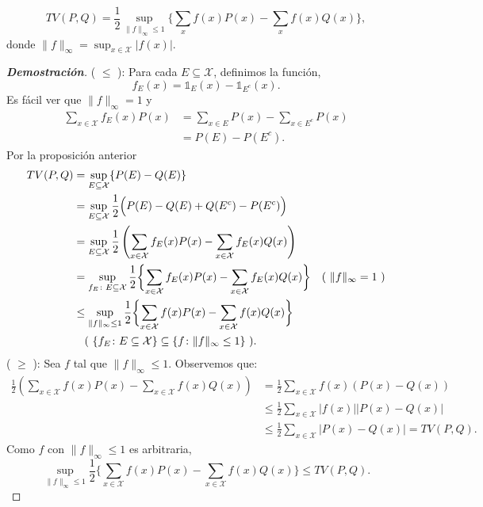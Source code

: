 \begin{theorem}
\begin{equation*}
    TV(P,Q)=\frac{1}{2}\sup_{\|f\|_{\infty}\leq1}\biggl\{\sum_{x}f(x)P(x)-\sum_{x}f(x)Q(x)\biggl\},
\end{equation*}
donde $\|f\|_{\infty}=\sup_{x\in\mathcal{X}}|f(x)|$.
\end{theorem}
\begin{proof}[\textbf{Demostraci\'on}]
( $\leq$ ): Para cada $E\subseteq\mathcal{X}$, definimos la funci\'on,
\begin{equation*}
    f_E(x)=\mathds{1}_E(x)-\mathds{1}_{E^c}(x).
\end{equation*}
Es f\'acil ver que $\|f\|_{\infty}=1$ y 
\begin{align*}
    \sum_{x\in\mathcal{X}}f_E(x)P(x)&=\sum_{x\in E}P(x)-\sum_{x\in E^c}P(x)\\
    &=P(E)-P(E^c).
\end{align*}
Por la proposici\'on anterior
\begin{align*}
    TV(P,Q)&=\sup_{E\subseteq\mathcal{X}}\{P(E)-Q(E)\}\\
    &=\sup_{E\subseteq\mathcal{X}}\frac{1}{2}\Bigl(P(E)-Q(E)+Q(E^c)-P(E^c)\Bigl)\\
    &=\sup_{E\subseteq\mathcal{X}}\frac{1}{2}\left(\sum_{x\in\mathcal{X}}f_E(x)P(x)-\sum_{x\in\mathcal{X}}f_E(x)Q(x)\right)\\
    &=\sup_{f_E\colon E\subseteq\mathcal{X}}\frac{1}{2}\biggl\{\sum_{x\in\mathcal{X}}f_E(x)P(x)-\sum_{x\in\mathcal{X}}f_E(x)Q(x)\biggl\}\quad\text{( $\|f\|_\infty=1$ )}\\
    &\leq\sup_{\|f\|_\infty\leq1}\frac{1}{2}\biggl\{\sum_{x\in\mathcal{X}}f(x)P(x)-\sum_{x\in\mathcal{X}}f(x)Q(x)\biggl\}\\
    &\quad\text{( $\{f_E\colon E\subseteq\mathcal{X}\}\subseteq\{f\colon\|f\|_\infty\leq1\}$ )}.
\end{align*}
\noindent( $\geq$ ): Sea $f$ tal que $\|f\|_\infty\leq1$. Observemos que:
\begin{align*}
    \frac{1}{2}\left(\sum_{x\in\mathcal{X}}f(x)P(x)-\sum_{x\in\mathcal{X}}f(x)Q(x)\right)&=\frac{1}{2}\sum_{x\in\mathcal{X}}f(x)(P(x)-Q(x))\\
    &\leq\frac{1}{2}\sum_{x\in\mathcal{X}}|f(x)||P(x)-Q(x)|\\
    &\leq\frac{1}{2}\sum_{x\in\mathcal{X}}|P(x)-Q(x)|=TV(P,Q).
\end{align*}
Como $f$ con $\|f\|_\infty\leq1$ es arbitraria,
\begin{equation*}
    \sup_{\|f\|_\infty\leq1}\frac{1}{2}\biggl\{\sum_{x\in\mathcal{X}}f(x)P(x)-\sum_{x\in\mathcal{X}}f(x)Q(x)\biggl\}\leq TV(P,Q).
\end{equation*}
\end{proof}

